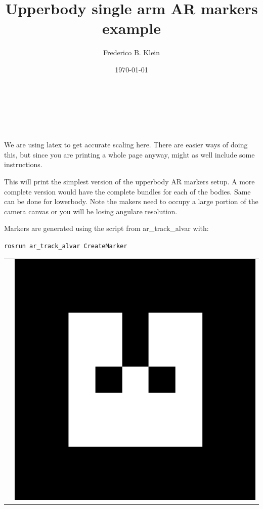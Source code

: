 \documentclass{article}
\title{\textbf{Upperbody single arm AR markers example }
}
\author{ Frederico B. Klein }
\date{\today}
\makeatletter
\renewcommand\maketitle{
{\raggedright %
\begin{center}
{\LARGE
\sffamily 
\@title }\\[2ex] 
{
\@author}\\[2ex] 
\@date\\[6ex]
\end{center}
}}
\newenvironment{Marker}[1]
    {\begin{center}
	    \vspace*{2cm}
	    \begin{tabular*}{\textwidth}{@{\extracolsep{\fill} } l r}
	    \rotatebox{90}{#1} &
    }
    { 
    \end{tabular*} 
	    \vspace*{2cm}
    \end{center}
    }
\makeatother
\begin{document}
\maketitle

\thispagestyle{empty}

We are using latex to get accurate scaling here. There are easier ways of doing this, but since you are printing a whole page anyway, might as well include some instructions. 

This will print the simplest version of the upperbody AR markers setup. A more complete version would have the complete bundles for each of the bodies. Same can be done for lowerbody. Note the makers need to occupy a large portion of the camera canvas or you will be losing angulare resolution. 

Markers are generated using the script from ar\_track\_alvar with:

\texttt{rosrun ar\_track\_alvar CreateMarker}

\begin{Marker}{TORAX}
    \centering
    \includegraphics[width=13cm]{MarkerData_0}
\end{Marker}

\end{document}
